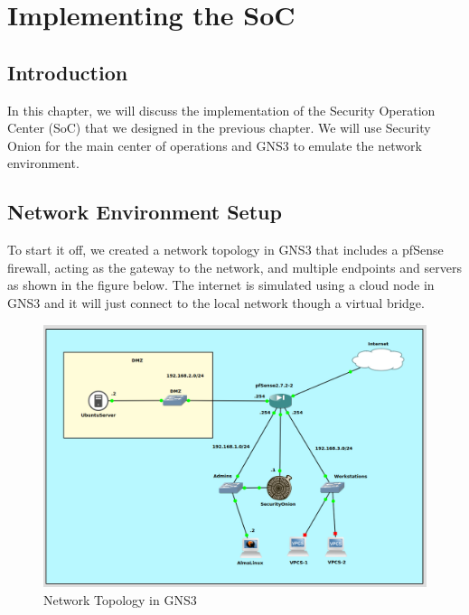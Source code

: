\chapter{Implementing the SoC}
\minitoc
\newpage

\setcounter{secnumdepth}{0} %
\section{Introduction}
In this chapter, we will discuss the implementation of the Security Operation Center (SoC) that we designed in the previous chapter.
We will use Security Onion for the main center of operations and GNS3 to emulate the network environment.

\setcounter{secnumdepth}{2} %
\section{Network Environment Setup}
To start it off, we created a network topology in GNS3 that includes a pfSense firewall, acting as the gateway to the network, and multiple endpoints and servers as shown in the figure below.
The internet is simulated using a cloud node in GNS3 and it will just connect to the local network though a virtual bridge.

\begin{figure}[H]
    \centering
    \includegraphics[width=1\textwidth]{src/assets/images/gns3-topology.png}
    \caption{Network Topology in GNS3}
\end{figure}

